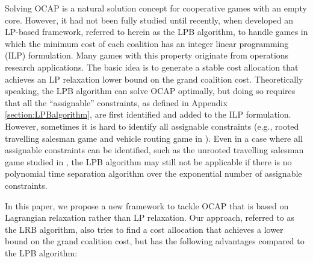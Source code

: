 \documentclass[ijoc,nonblindrev]{informs3} %
\begin{document}

Solving OCAP is a natural solution concept for cooperative games with an empty core.
However, it had not been fully studied until recently, when \cite{Caprara2010LPB} developed an LP-based framework, referred to herein as the LPB algorithm, to handle games in which the minimum cost of each coalition has an integer linear programming (ILP) formulation.
Many games with this property originate from operations research applications. 
The basic idea is to generate a stable cost allocation that achieves an LP relaxation lower bound on the grand coalition cost. 
Theoretically speaking, the LPB algorithm can solve OCAP optimally, but doing so requires that all the ``assignable'' constraints, as defined in Appendix \ref{section:LPBalgorithm}, are first identified and added to the ILP formulation. However, sometimes it is hard to identify all assignable constraints (e.g., rooted travelling salesman game and vehicle routing game in \citealt{Caprara2010LPB}). 
Even in a case where all assignable constraints can be identified, such as the unrooted travelling salesman game studied in \cite{Caprara2010LPB}, the LPB algorithm may still not be applicable if there is no polynomial time separation algorithm over the exponential number of assignable constraints.


In this paper, we propose a new framework to tackle OCAP that is based on Lagrangian relaxation rather than LP relaxation. Our approach, referred to as the LRB algorithm, also tries to find a cost allocation that achieves a lower bound  on the grand coalition cost, but has the following advantages compared to the LPB algorithm:
\end{document}
